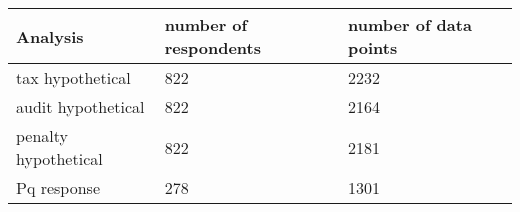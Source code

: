 \begin{table}[ht]
\centering
\begin{tabular}{lll}
  \hline
Analysis & number of respondents & number of data points \\ 
  \hline
tax hypothetical & 822 & 2232 \\ 
  audit hypothetical & 822 & 2164 \\ 
  penalty hypothetical & 822 & 2181 \\ 
  Pq response & 278 & 1301 \\ 
   \hline
\end{tabular}
\end{table}
